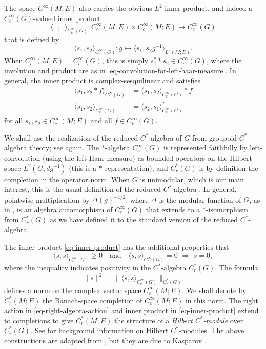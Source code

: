 \documentclass[leqno,11pt]{amsart}
\numberwithin{equation}{subsection}
\theoremstyle{plain}
\theoremstyle{definition}
\theoremstyle{remark}
\begin{document}
The space $C^\infty (M;E)$  also carries the obvious $L^2$-inner product, and indeed a $C_c^\infty (G)$-valued inner product
\begin{equation}
    \label{eq-inner-product}
\langle\,\,\,\,,\,\,\,\rangle_{C^\infty _c (G)} : C_c^\infty (M;E) \times C_c^\infty (M;E) \longrightarrow C_c^\infty (G)
\end{equation}
that is defined by 
\[
\langle s_1, s_2 \rangle _{C^\infty _c (G)} : g \longmapsto    \langle s_1,  s_2 g^{-1} \rangle_{L^2(M;E)} .
\]
When $C_c^\infty (M,E) = C_c^\infty (G)$, this is simply $s_1^**s_2\in C_c^\infty (G)$, where the involution and product are as in \eqref{eq-convolution-for-left-haar-measure}.  In general, the inner product is complex-sesquilinear and satisfies 
\[
\begin{aligned} 
\langle s_1, s_2* f \rangle _{C^\infty _c (G)} & = \langle s_1, s_2 \rangle _{C^\infty _c (G)}* f\\
\langle s_1, s_2 \rangle _{C^\infty _c (G)} & = \langle s_2, s_1 \rangle _{C^\infty _c (G)}^*
\end{aligned}
\]
for all $s_1,s_2\in C_c^\infty (M;E)$ and all $f\in C_c^\infty (G)$.

We shall use the realization of the reduced $C^*$-algebra of $G$ from groupoid $C^*$-algebra theory; see \cite[Sec.\,II.1]{RenaultGroupoidApproach80} again. The $*$-algebra $C^\infty _c (G)$ is represented faithfully by left-convolution (using the left Haar measure) as bounded operators on the Hilbert space $L^2 (G,dg^{-1})$ (this is a $*$-represen\-tation), and $C^*_r(G)$ is by definition the completion in the operator norm. When $G$ is unimodular, which is our main interest, this is the usual definition of the reduced $C^*$-algebra \cite[Sec.\,7.2]{PedersenCstarBook}. In general, pointwise multiplication by $\Delta(g)^{-1/2}$, where $\Delta$ is the modular function of $G$, as in \cite[Sec.\,7.1]{PedersenCstarBook}, is an algebra automorphism of $C_c^\infty(G)$ that extends to a $*$-isomorphism from  $C^*_r(G)$ as we have defined it to the standard version of the reduced $C^*$-algebra.

The inner product \eqref{eq-inner-product} has the additional properties that 
\[
\langle s,s\rangle _{C^\infty_c (G)} \ge 0 \quad \text{and} \quad 
\langle s,s\rangle _{C^\infty_c (G)} = 0 \,\, \Rightarrow \,\, s =0 ,
\]
where the inequality indicates positivity in the $C^*$-algebra $C^*_r (G)$. The formula 
\[
\| s\|^2   = \| \langle s,s\rangle_{C^\infty _c (G)} \|_{C^*_r (G)} 
\]
defines a norm on the complex vector space $C_c^\infty (M;E)$.  We shall denote by $C^*_r(M;E)$ the Banach-space completion of $C^\infty _c (M;E)$ in this norm.  The right action in \eqref{eq-right-algebra-action} and inner product in \eqref{eq-inner-product} extend to completions to give $C^*_r (M;E)$ the structure of a \emph{Hilbert $C^*$-module} over $C^*_r (G)$. See \cite{Lance95} for background information on Hilbert $C^*$-modules. The above constructions are adapted from   \cite[Sec.~3]{BaumConnesHigson93}, but they are  due to Kasparov \cite{Kasparov88}.
\end{document}
